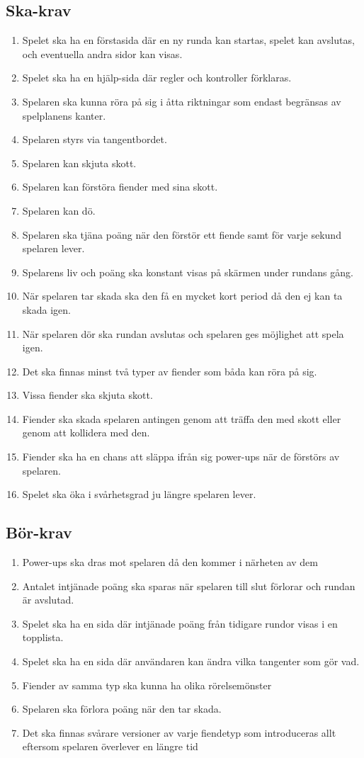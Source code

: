 \documentclass{TDP005mall}
\begin{document}
\subsection{Ska-krav}
\begin{enumerate}
\item Spelet ska ha en förstasida där en ny runda kan startas, spelet kan avslutas, och eventuella andra sidor kan visas.
\item Spelet ska ha en hjälp-sida där regler och kontroller förklaras.
\item Spelaren ska kunna röra på sig i åtta riktningar som endast begränsas av spelplanens kanter.
\item Spelaren styrs via tangentbordet.
\item Spelaren kan skjuta skott.
\item Spelaren kan förstöra fiender med sina skott.
\item Spelaren kan dö.
\item Spelaren ska tjäna poäng när den förstör ett fiende samt för varje sekund spelaren lever.
\item Spelarens liv och poäng ska konstant visas på skärmen under rundans gång.
\item När spelaren tar skada ska den få en mycket kort period då den ej kan ta skada igen.
\item När spelaren dör ska rundan avslutas och spelaren ges möjlighet att spela igen.
\item Det ska finnas minst två typer av fiender som båda kan röra på sig.
\item Vissa fiender ska skjuta skott.
\item Fiender ska skada spelaren antingen genom att träffa den med skott eller genom att kollidera med den.
\item Fiender ska ha en chans att släppa ifrån sig power-ups när de förstörs av spelaren.
\item Spelet ska öka i svårhetsgrad ju längre spelaren lever. %
\end{enumerate}

\subsection{Bör-krav}
\begin{enumerate}
\item Power-ups ska dras mot spelaren då den kommer i närheten av dem
\item Antalet intjänade poäng ska sparas när spelaren till slut förlorar och rundan är avslutad.
\item Spelet ska ha en sida där intjänade poäng från tidigare rundor visas i en topplista.
\item Spelet ska ha en sida där användaren kan ändra vilka tangenter som gör vad.
\item Fiender av samma typ ska kunna ha olika rörelsemönster
\item Spelaren ska förlora poäng när den tar skada. %
\item Det ska finnas svårare versioner av varje fiendetyp som introduceras allt eftersom spelaren överlever en längre tid
\end{enumerate}
\end{document}
